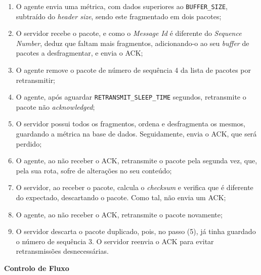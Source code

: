 \documentclass[a4paper,12pt]{scrreprt}
\begin{document}
\begin{enumerate}
    \item O agente envia uma métrica, com dados superiores ao \texttt{BUFFER\_SIZE}, subtraído do \textit{header size},
    sendo este fragmentado em dois pacotes;
    \item O servidor recebe o pacote, e como o \textit{Message Id} é diferente do \textit{Sequence Number}, deduz que
    faltam mais fragmentos, adicionando-o ao seu \textit{buffer} de pacotes a desfragmentar, e envia o ACK;
    \item O agente remove o pacote de número de sequência 4 da lista de pacotes por retransmitir;
    \item O agente, após aguardar \texttt{RETRANSMIT\_SLEEP\_TIME} segundos, retransmite o pacote não \textit{acknowledged};
    \item O servidor possui todos os fragmentos, ordena e desfragmenta os mesmos, guardando a métrica na base de dados.
    Seguidamente, envia o ACK, que será perdido;
    \item O agente, ao não receber o ACK, retransmite o pacote pela segunda vez, que, pela sua rota, sofre de alterações
    no seu conteúdo;
    \item O servidor, ao receber o pacote, calcula o \textit{checksum} e verifica que é diferente do expectado, descartando
    o pacote. Como tal, não envia um ACK;
    \item O agente, ao não receber o ACK, retransmite o pacote novamente;
    \item O servidor descarta o pacote duplicado, pois, no passo (5), já tinha guardado o número de sequência 3.
    O servidor reenvia o ACK para evitar retransmissões desnecessárias.
\end{enumerate}

\clearpage

\textbf{Controlo de Fluxo}
\end{document}
